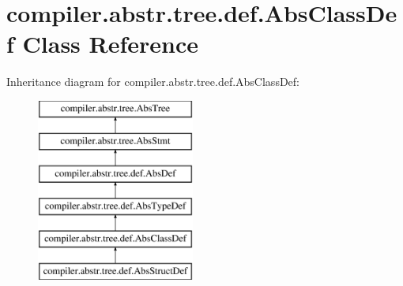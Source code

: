 \hypertarget{classcompiler_1_1abstr_1_1tree_1_1def_1_1_abs_class_def}{}\section{compiler.\+abstr.\+tree.\+def.\+Abs\+Class\+Def Class Reference}
\label{classcompiler_1_1abstr_1_1tree_1_1def_1_1_abs_class_def}
Inheritance diagram for compiler.\+abstr.\+tree.\+def.\+Abs\+Class\+Def\+:\begin{figure}[H]
\begin{center}
\leavevmode
\includegraphics[height=6.000000cm]{classcompiler_1_1abstr_1_1tree_1_1def_1_1_abs_class_def}
\end{center}
\end{figure}
